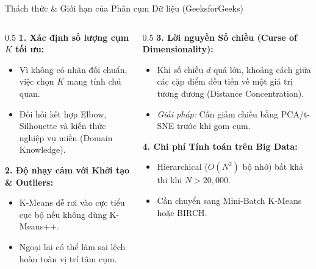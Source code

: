 \documentclass[aspectratio=169,10pt]{beamer}
\begin{document}
\begin{frame}{Thách thức \& Giới hạn của Phân cụm Dữ liệu (GeeksforGeeks)}
  \small
  \begin{columns}[T]
    \begin{column}{0.5\textwidth}
      \textbf{1. Xác định số lượng cụm $K$ tối ưu:}
      \begin{itemize}\setlength{\itemsep}{2pt}
        \item Vì không có nhãn đối chuẩn, việc chọn $K$ mang tính chủ quan.
        \item Đòi hỏi kết hợp Elbow, Silhouette và kiến thức nghiệp vụ miền (Domain Knowledge).
      \end{itemize}
      \vspace{0.4em}
      \textbf{2. Độ nhạy cảm với Khởi tạo \& Outliers:}
      \begin{itemize}\setlength{\itemsep}{2pt}
        \item K-Means dễ rơi vào cực tiểu cục bộ nếu không dùng K-Means++.
        \item Ngoại lai có thể làm sai lệch hoàn toàn vị trí tâm cụm.
      \end{itemize}
    \end{column}
    \begin{column}{0.5\textwidth}
      \textbf{3. Lời nguyền Số chiều (Curse of Dimensionality):}
      \begin{itemize}\setlength{\itemsep}{2pt}
        \item Khi số chiều $d$ quá lớn, khoảng cách giữa các cặp điểm đều tiến về một giá trị tương đương (Distance Concentration).
        \item \textit{Giải pháp:} Cần giảm chiều bằng PCA/t-SNE trước khi gom cụm.
      \end{itemize}
      \vspace{0.4em}
      \textbf{4. Chi phí Tính toán trên Big Data:}
      \begin{itemize}\setlength{\itemsep}{2pt}
        \item Hierarchical ($O(N^2)$ bộ nhớ) bất khả thi khi $N > 20{,}000$.
        \item Cần chuyển sang Mini-Batch K-Means hoặc BIRCH.
      \end{itemize}
    \end{column}
  \end{columns}
\end{frame}
\end{document}
